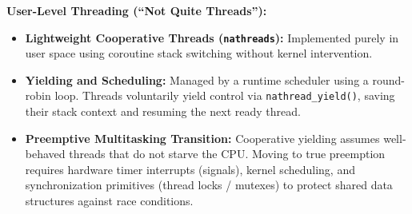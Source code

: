 \begin{definition}
    \textbf{User-Level Threading (``Not Quite Threads''):}
    \begin{itemize}
        \item \textbf{Lightweight Cooperative Threads (\texttt{nathreads}):} Implemented purely in user space using coroutine stack switching without kernel intervention.
        \item \textbf{Yielding and Scheduling:} Managed by a runtime scheduler using a round-robin loop. Threads voluntarily yield control via \texttt{nathread\_yield()}, saving their stack context and resuming the next ready thread.
        \item \textbf{Preemptive Multitasking Transition:} Cooperative yielding assumes well-behaved threads that do not starve the CPU. Moving to true preemption requires hardware timer interrupts (signals), kernel scheduling, and synchronization primitives (thread locks / mutexes) to protect shared data structures against race conditions.
    \end{itemize}
\end{definition}